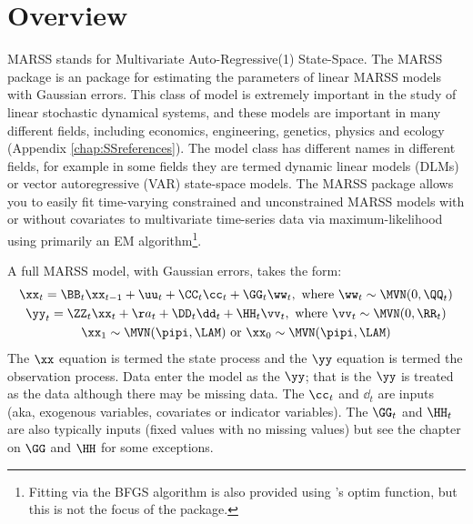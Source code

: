 \chapter{Overview}
\label{chap:intro}

MARSS stands for Multivariate Auto-Regressive(1) State-Space. The MARSS package is an \R package for estimating the parameters of linear MARSS models with Gaussian errors.  This class of model is extremely important in the study of linear stochastic dynamical systems, and these models are important in many different fields, including economics, engineering, genetics, physics and ecology (Appendix \ref{chap:SSreferences}).  The model class has different names in different fields, for example in some fields they are termed dynamic linear models (DLMs) or vector autoregressive (VAR) state-space models.  The MARSS package allows you to easily fit time-varying constrained and unconstrained MARSS models with or without covariates to multivariate time-series data via maximum-likelihood using primarily an EM algorithm\footnote{Fitting via the BFGS algorithm is also provided using \R's optim function, but this is not the focus of the package.}.

A full MARSS model, with Gaussian errors, takes the form:
\begin{subequations}\label{eqn:marss}
\begin{gather}
\xx_t = \BB_t\xx_{t-1} + \uu_t + \CC_t\cc_t + \GG_t\ww_t, \text{ where } \ww_t \sim \MVN(0,\QQ_t) \label{eqn:marssx}\\
\yy_t = \ZZ_t\xx_t + \aa_t + \DD_t\dd_t + \HH_t\vv_t, \text{ where } \vv_t \sim \MVN(0,\RR_t) \label{eqn:marssy}\\
\xx_1 \sim \MVN(\pipi,\LAM) \text{ or } \xx_0 \sim \MVN(\pipi,\LAM)\label{eqn:marssx1}
\end{gather}
\end{subequations}
The $\xx$ equation is termed the state process and the $\yy$ equation is termed the observation process.  Data enter the model as the $\yy$; that is the $\yy$ is treated as the data although there may be missing data.  The $\cc_t$ and $\dd_t$ are inputs (aka, exogenous variables, covariates or indicator variables).  The $\GG_t$ and $\HH_t$ are also typically inputs (fixed values with no missing values) but see the chapter on $\GG$ and $\HH$ for some exceptions.

